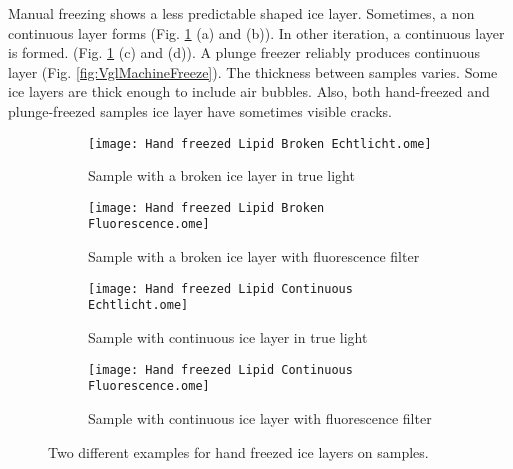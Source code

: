 Manual freezing shows a less predictable shaped ice layer. Sometimes, a non continuous layer forms (Fig. \ref{fig:VglHandFreeze} (a) and (b)). In other iteration, a continuous layer is formed. (Fig. \ref{fig:VglHandFreeze} (c) and (d)). A plunge freezer reliably produces continuous layer (Fig. \ref{fig:VglMachineFreeze}). The thickness between samples varies. Some ice layers are thick enough to include air bubbles. Also, both hand-freezed and plunge-freezed samples ice layer have sometimes visible cracks.

\begin{figure}[hbt!]
	\centering
	\begin{subfigure}[]{0.45\textwidth}
		\centering
		\texttt{[image: Hand freezed Lipid Broken Echtlicht.ome]}
		\caption{Sample with a broken ice layer in true light \newline}
	\end{subfigure}
	\begin{subfigure}[]{0.45\textwidth}
		\centering
		\texttt{[image: Hand freezed Lipid Broken Fluorescence.ome]}
		\caption{Sample with a broken ice layer with fluorescence filter}
	\end{subfigure}
	\begin{subfigure}[]{0.45\textwidth}
		\centering
		\texttt{[image: Hand freezed Lipid Continuous Echtlicht.ome]}
		\caption{Sample with continuous ice layer in true light \newline}
	\end{subfigure}
	\begin{subfigure}[]{0.45\textwidth}
		\centering
		\texttt{[image: Hand freezed Lipid Continuous Fluorescence.ome]}
		\caption{Sample with continuous ice layer with fluorescence filter}
	\end{subfigure}
	\caption{Two different examples for hand freezed ice layers on samples. }
	\label{fig:VglHandFreeze}
\end{figure}

